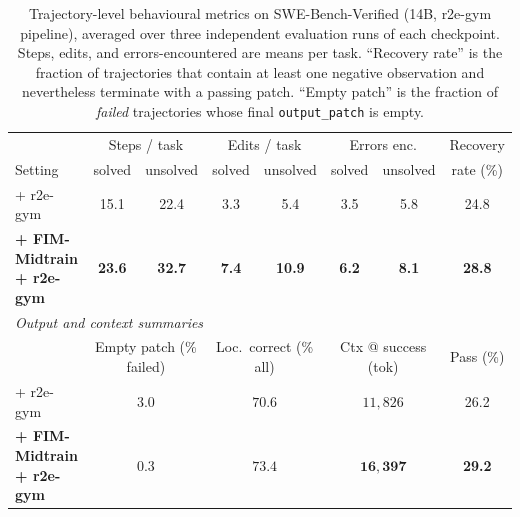 \begin{table}[h]
\centering
\caption{Trajectory-level behavioural metrics on SWE-Bench-Verified (14B,
r2e-gym pipeline), averaged over three independent evaluation runs of each
checkpoint. Steps, edits, and errors-encountered are means per task.
``Recovery rate'' is the fraction of trajectories that contain at least one
negative observation and nevertheless terminate with a passing patch.
``Empty patch'' is the fraction of \emph{failed} trajectories whose final
\texttt{output\_patch} is empty.}
\label{tab:behavior}
\small
\setlength{\tabcolsep}{4pt}
\begin{tabular}{l c c c c c c c}
\toprule
& \multicolumn{2}{c}{Steps / task}
& \multicolumn{2}{c}{Edits / task}
& \multicolumn{2}{c}{Errors enc.}
& Recovery \\
\cmidrule(lr){2-3}\cmidrule(lr){4-5}\cmidrule(lr){6-7}
Setting & solved & unsolved & solved & unsolved & solved & unsolved & rate (\%) \\
\midrule
+ r2e-gym
  & 15.1 & 22.4 & 3.3 & 5.4 & 3.5 & 5.8 & 24.8 \\
\textbf{+ FIM-Midtrain + r2e-gym}
  & \textbf{23.6} & \textbf{32.7} & \textbf{7.4} & \textbf{10.9}
  & \textbf{6.2} & \textbf{8.1} & \textbf{28.8} \\
\midrule
\multicolumn{8}{l}{\textit{Output and context summaries}} \\
\midrule
& \multicolumn{2}{c}{Empty patch (\% failed)}
& \multicolumn{2}{c}{Loc.\ correct (\% all)}
& \multicolumn{2}{c}{Ctx @ success (tok)}
& Pass (\%) \\
\cmidrule(lr){2-3}\cmidrule(lr){4-5}\cmidrule(lr){6-7}
+ r2e-gym
  & \multicolumn{2}{c}{$3.0$} & \multicolumn{2}{c}{$70.6$}
  & \multicolumn{2}{c}{$11{,}826$} & 26.2 \\
\textbf{+ FIM-Midtrain + r2e-gym}
  & \multicolumn{2}{c}{$\mathbf{0.3}$} & \multicolumn{2}{c}{$\mathbf{73.4}$}
  & \multicolumn{2}{c}{$\mathbf{16{,}397}$} & \textbf{29.2} \\
\bottomrule
\end{tabular}
\end{table}


